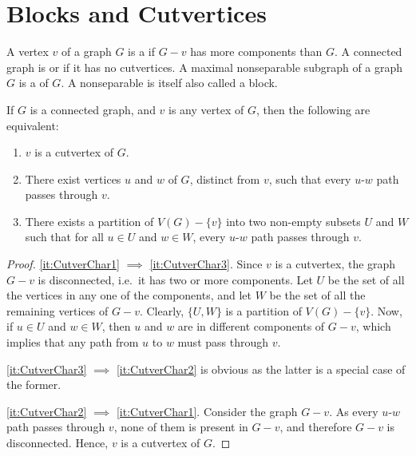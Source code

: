 \section{Blocks and Cutvertices}\label{sec:Blocks}

A vertex $v$ of a graph $G$ is a  if $G - v$ has more components than $G$. A connected graph is  or  if it has no cutvertices. A maximal nonseparable subgraph of a graph $G$ is a  of $G$. A nonseparable is itself also called a block.

\begin{Theorem}\label{thm:CutverChar}
If $G$ is a connected graph, and $v$ is any vertex of $G$, then the following are equivalent:
\begin{enumerate}[label=(\roman*)]
\item\label{it:CutverChar1} $v$ is a cutvertex of $G$.
\item\label{it:CutverChar2} There exist vertices $u$ and $w$ of $G$, distinct from $v$, such that every $u$-$w$ path passes through $v$.
\item\label{it:CutverChar3} There exists a partition of $V(G) - \{v\}$ into two non-empty subsets $U$ and $W$ such that for all $u \in U$ and $w \in W$, every $u$-$w$ path passes through $v$.
\end{enumerate}
\end{Theorem}

\begin{proof}
\cref{it:CutverChar1} $\implies $ \cref{it:CutverChar3}. Since $v$ is a cutvertex, the graph $G - v$ is disconnected, i.e.\ it has two or more components. Let $U$ be the set of all the vertices in any one of the components, and let $W$ be the set of all the remaining vertices of $G - v$. Clearly, $\{U, W\}$ is a partition of $V(G) - \{v\}$. Now, if $u \in U$ and $w \in W$, then $u$ and $w$ are in different components of $G - v$, which implies that any path from $u$ to $w$ must pass through $v$.

\noindent \cref{it:CutverChar3} $\implies$ \cref{it:CutverChar2} is obvious as the latter is a special case of the former.

\noindent \cref{it:CutverChar2} $\implies$ \cref{it:CutverChar1}. Consider the graph $G - v$. As every $u$-$w$ path passes through $v$, none of them is present in $G - v$, and therefore $G - v$ is disconnected. Hence, $v$ is a cutvertex of $G$.
\end{proof}

